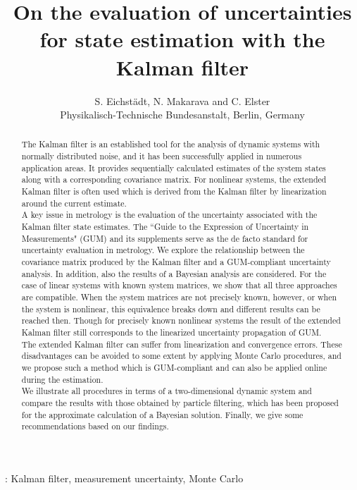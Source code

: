 \documentclass[10pt]{article}
\title{On the evaluation of uncertainties for state estimation with the Kalman filter}
\author{S. Eichstädt, N. Makarava and C. Elster \\
{\small Physikalisch-Technische Bundesanstalt, Berlin, Germany}}
\date{}
\begin{document}
\begin{spacing}{1}
\maketitle	


\vspace{10pt}

\begin{abstract}
The Kalman filter is an established tool for the analysis of dynamic systems with normally distributed noise, and it has been successfully applied in numerous application areas. It provides sequentially calculated estimates of the system states along with a corresponding covariance matrix. For nonlinear systems, the extended Kalman filter is often used which is derived from the Kalman filter by linearization around the current estimate.\\
A key issue in metrology is the evaluation of the uncertainty associated with the Kalman filter state estimates. The ``Guide to the Expression of Uncertainty in Measurements" (GUM) and its supplements serve as the de facto standard for uncertainty evaluation in metrology. We explore the relationship between the covariance matrix produced by the Kalman filter and a GUM-compliant uncertainty analysis. In addition, also the results of a Bayesian analysis are considered. For the case of linear systems with known system matrices, we show that all three approaches are compatible. When the system matrices are not precisely known, however, or when the system is nonlinear, this equivalence breaks down  and different results can be reached then. Though for precisely known nonlinear systems the result of the extended Kalman filter still corresponds to the linearized uncertainty propagation of GUM.\\
The extended Kalman filter can suffer from linearization and convergence errors. These disadvantages  can be avoided to some extent by applying Monte Carlo procedures, and we propose such a method which is GUM-compliant and can also be applied online during the estimation.\\
We illustrate all procedures in terms of a two-dimensional dynamic system and compare the results with those obtained by particle filtering, which has been proposed for the approximate calculation of a Bayesian solution. Finally, we give some recommendations based on our findings.
\end{abstract}

\vspace{2pc}
: Kalman filter, measurement uncertainty, Monte Carlo


\end{spacing}
\end{document}
